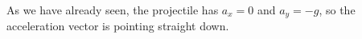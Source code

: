 As we have already seen, the projectile has 
$a_x=0$ and $a_y=-g$,
so the acceleration vector is pointing straight down.



